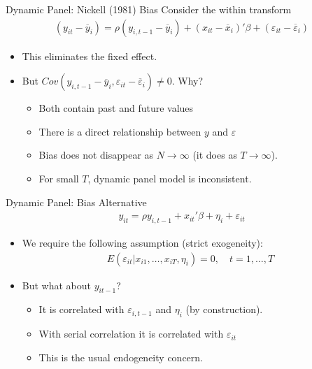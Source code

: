 \documentclass[aspectratio=169]{beamer}
\begin{document}
\begin{frame}{Dynamic Panel: Nickell (1981) Bias}
Consider the within transform
\begin{eqnarray*}
(y_{it}-\overline{y}_i) = \rho (y_{i,t-1}-\overline{y}_i) + (x_{it}-\overline{x}_i)'\beta +( \varepsilon_{it}- \overline{\varepsilon}_{i})
\end{eqnarray*}
\begin{itemize}
\item This eliminates the fixed effect.
\item But $Cov(y_{i,t-1}-\overline{y}_i, \varepsilon_{it}- \overline{\varepsilon}_{i}) \neq0$. Why?
\begin{itemize}
\item Both contain past and future values
\item There is a direct relationship between $y$ and $\varepsilon$
\item Bias does not disappear as $N \rightarrow \infty$ (it does as $T\rightarrow \infty$).
\item For small $T$, dynamic panel model is \alert{inconsistent}.
\end{itemize}
\end{itemize}
\end{frame}

\begin{frame}{Dynamic Panel: Bias Alternative}
\begin{eqnarray*}
y_{it} = \rho y_{i,t-1} + x_{it}'\beta + \eta_i + \varepsilon_{it}
\end{eqnarray*}
\begin{itemize}
\item We require the following assumption (\alert{strict exogeneity}):
\begin{eqnarray*}
E\left(\varepsilon_{i t} | x_{i 1}, \ldots, x_{i T}, \eta_{i}\right)=0, \quad t=1, \ldots, T
\end{eqnarray*}
\item But what about $y_{it-1}$? 
\begin{itemize}
\item It is correlated with $\varepsilon_{i,t-1}$ and $\eta_i$ (by construction).
\item With serial correlation it is correlated with $\varepsilon_{it}$
\item This is the usual \alert{endogeneity} concern.
\end{itemize}
\end{itemize}
\end{frame}
\end{document}
